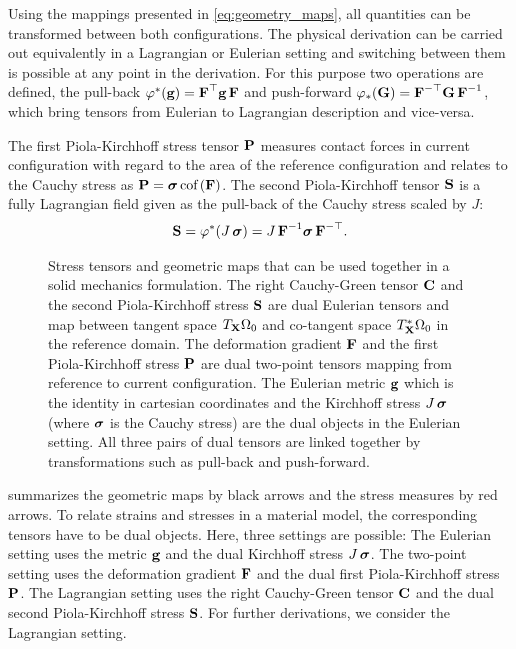 Using the mappings presented in \cref{eq:geometry_maps}, all quantities can be transformed between both configurations. 
The physical derivation can be carried out equivalently in a Lagrangian or Eulerian setting and switching between them is possible at any point in the derivation. For this purpose two operations are defined, the pull-back $\varphi^\ast(\textbf{g}) = \textbf{F}^\top\textbf{g}\,\textbf{F}$ and push-forward $\varphi_\ast(\textbf{G}) = \textbf{F}^{-\top}\textbf{G}\,\textbf{F}^{-1}$, which bring tensors from Eulerian to Lagrangian description and vice-versa.

The first Piola-Kirchhoff stress tensor $\textbf{P}$ measures contact forces in current configuration with regard to the area of the reference configuration and relates to the Cauchy stress as $\textbf{P} = \boldsymbol{\sigma}\,\hbox{cof} \,(\textbf{F})$. The second Piola-Kirchhoff tensor $\textbf{S}$ is a fully Lagrangian field given as the pull-back of the Cauchy stress scaled by $J$:%
\begin{align*}
  \textbf{S} = \varphi^\ast(J\,\boldsymbol{\sigma}) = J\,\textbf{F}^{-1}\boldsymbol{\sigma}\,\textbf{F}^{-\top}.
\end{align*}

\begin{figure}
  \centering%
  \def\svgwidth{0.5\textwidth}
  \caption{Stress tensors and geometric maps that can be used together in a solid mechanics formulation. The right Cauchy-Green tensor $\textbf{C}$  and the second Piola-Kirchhoff stress $\textbf{S}$ are dual Eulerian tensors and map between tangent space $T_{\textbf{X}}\Omega_0$ and co-tangent space $T^\ast_{\textbf{X}}\Omega_0$ in the reference domain. The deformation gradient $\textbf{F}$ and the first Piola-Kirchhoff stress $\textbf{P}$ are dual two-point tensors mapping from reference to current configuration. The Eulerian metric $\textbf{g}$ which is the identity in cartesian coordinates and the Kirchhoff stress $J\,\boldsymbol{\sigma}$ (where $\boldsymbol{\sigma}$ is the Cauchy stress) are the dual objects in the Eulerian setting. All three pairs of dual tensors are linked together by transformations such as pull-back and push-forward.}%
  \label{fig:stress_tensors}%
\end{figure}

 summarizes the geometric maps by black arrows and the stress measures by red arrows. To relate strains and stresses in a material model, the corresponding tensors have to be dual objects. Here, three settings are possible: The Eulerian setting uses the metric $\textbf{g}$ and the dual Kirchhoff stress $J\,\boldsymbol{\sigma}$. The two-point setting uses the deformation gradient $\textbf{F}$ and the dual first Piola-Kirchhoff stress $\textbf{P}$. The Lagrangian setting uses the right Cauchy-Green tensor $\textbf{C}$ and the dual second Piola-Kirchhoff stress $\textbf{S}$. For further derivations, we consider the Lagrangian setting.

